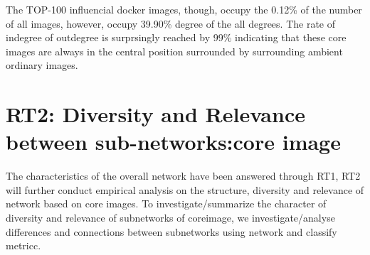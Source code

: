 \documentclass[sigconf]{acmart}
\begin{document}
\begin{mybox}
The TOP-100 influencial docker images, though, occupy the 0.12\% of the number of all images, however, occupy 39.90\% degree of the all degrees. The rate of indegree of outdegree is surprsingly reached by 99\% indicating that these core images are always in the central position surrounded by surrounding ambient ordinary images. 
\end{mybox}





































\section{RT2: Diversity and Relevance between sub-networks:core image}

The characteristics of the overall network have been answered through RT1, RT2 will further conduct empirical analysis on the structure, diversity and relevance of network based on core images.  To investigate/summarize the character of diversity and relevance of subnetworks of coreimage, we investigate/analyse differences and connections between subnetworks using network and classify metricc.







\end{document}
